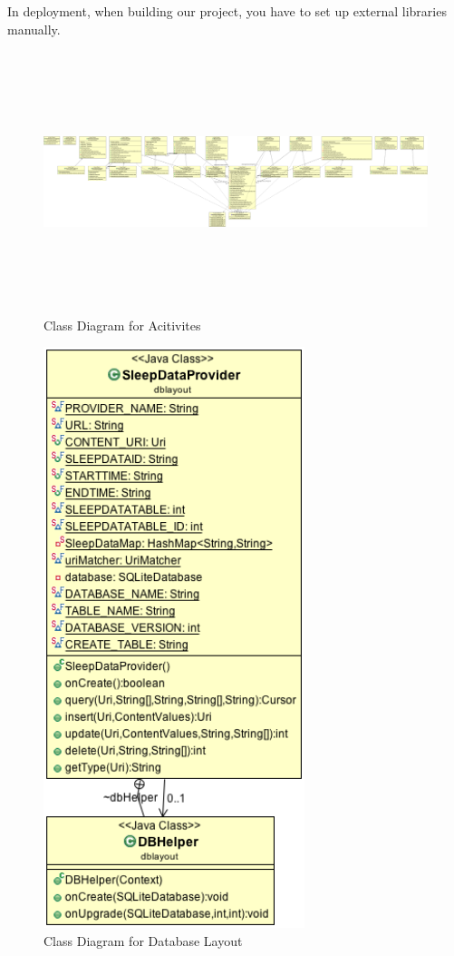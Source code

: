 \documentclass[14pt]{extreport}
\begin{document}
In deployment, when building our project, you have to set up external libraries manually.

\begin{figure}[h]
\begin{center}
\includegraphics[width=6in,height=3in]{ClassDiagramForAcitivites}
\end{center}
\caption[Class Diagram for Acitivites]{Class Diagram for Acitivites}
\end{figure}

\begin{figure}[h]
\begin{center}
\includegraphics[width=3in]{ClassDiagramForDB}
\end{center}
\caption[Class Diagram for Database Layout]{Class Diagram for Database Layout}
\end{figure}
\end{document}
